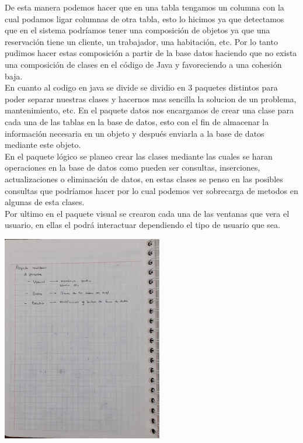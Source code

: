 \documentclass[12pt]{article}
\begin{document}
\begin{flushleft}
\textsf{De esta manera podemos hacer que en una tabla tengamos un columna  con la cual podamos ligar columnas de otra tabla, esto lo hicimos ya que detectamos que en el sistema podríamos tener una composición de objetos ya que una reservación tiene un cliente, un trabajador, una habitación, etc. Por lo tanto pudimos hacer estas composición  a partir de la base datos haciendo que no exista una composición de clases en el código de Java y favoreciendo a una cohesión baja.\\
En cuanto al codigo en java se divide se dividio en 3 paquetes distintos para poder separar nuestras clases y hacernos mas sencilla la solucion de un problema, mantenimiento, etc. En el paquete datos nos encargamos de crear una clase para cada una de las tablas en la base de datos, esto con el fin de almacenar la información necesaria en un objeto y después enviarla a la base de datos mediante este objeto.\\
En el paquete lógico se planeo crear las clases mediante las cuales se haran operaciones en la base de datos como pueden ser consultas, inserciones, actualizaciones o eliminación de datos, en estas clases se penso en las posibles consultas que podríamos hacer por lo cual  podemos ver sobrecarga de metodos en algunas de esta clases.\\
Por ultimo en el paquete visual se crearon cada una de las ventanas que vera el usuario, en ellas el podrá interactuar dependiendo el tipo de usuario que sea.}

\vspace{0.5cm}
\begin{center}
\includegraphics[width=7cm]{diseno1.png}
\end{center}
\vspace{0.5cm}


\end{flushleft}
\end{document}
